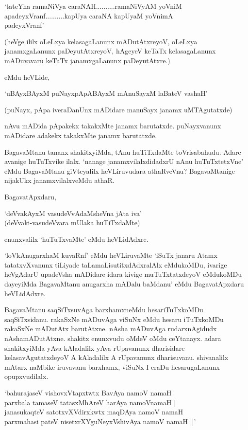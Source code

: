 \begin{shloka}
`tateYha ramaNiVya caraNAH..........ramaNiVyAM yoVniM\\
apadeyxVranf..........kapUya caraNA kapUyaM yoVnimA\\
padeyxVranf'
\end{shloka}

(heVge ililx oLeLxya kelasagaLanunx mADutAtxreyoV, oLeLxya janamxgaLanunx paDeyutAtxreyoV, hAgeyeV keTaTx kelasagaLanunx mADuvavaru keTaTx janamxgaLanunx paDeyutAtxre.)

eMdu heVLide,

\begin{shloka}
`uBAyxBAyxM puNayxpApABAyxM mAnuSayxM laBateV vashaH'
\end{shloka}

(puNayx, pApa iveraDanUnx mADidare manuSayx janamx uMTAgutatxde)

nAvu mADida pApakekx takakxMte janamx barutatxde. puNayxvanunx mADidare adakekx takakxMte janamx barutatxde.

BagavaMtanu tananx shakitxyiMda, tAnu huTiTxdaMte toVrisabahudu. Adare avanige huTuTxvike ilalx. `nanage janamxvilalxdidadxrU nAnu huTuTxtetxVne' eMdu BagavaMtanu giVteyalilx heVLiruvudara athaRveVnu? BagavaMtanige nijakUkx janamxvilalxveMdu athaR.

BagavatApxdaru,

\begin{shloka}
`deVvakAyxM vasudeVvAdaMsheVna jAta iva'\\
(deVvaki-vasudeVvara mUlaka huTiTxdaMte)
\end{shloka}

enunxvalilx `huTuTxvaMte' eMdu heVLidAdxre.

`loVkAnugarxhaM kuvaRnf' eMdu heVLiruvaMte `iSuTx janaru Atamx tatatxvXvanunx tiLiyade taLamaLisutitxdAdxralAlx eMdukoMDu, ivarige heVgAdarU upadeVsha mADidare idara kivige muTuTxtatxdeyoV eMdukoMDu dayeyiMda BagavaMtanu anugarxha mADalu baMdanu' eMdu BagavatApxdaru heVLidAdxre.


BagavaMtanu saqSiTxsuvAga barxhamxneMdu hesariTuTxkoMDu saqSiTxsidanu. rakaSxNe mADuvAga viSuNx eMdu hesaru iTuTxkoMDu rakaSxNe mADutAtx barutAtxne. nAsha mADuvAga rudarxnAgidudx nAshamADutAtxne. shakitx enunxvudu oMdeV oMdu ceYtanayx. adara shakitxyiMda yAva kAladalilx yAva rUpavanunx dharisidare kelasavAgutatxdeyoV A kAladalilx A rUpavanunx dharisuvanu. shivanalilx mAtarx naMbike iruvavanu barxhamx, viSuNx I eraDu hesarugaLanunx opupxvudilalx.


\begin{shloka}
`bahurajaseV vishovxVtapxtwtx BavAya namoV namaH\\
parxbala tamaseV tatasxMhAreV harAya namoVnamaH‌ |\\
janasukaqteV satotxvXVdirxkwtx maqDAya namoV namaH\\
parxmahasi pateV nisetxrXYguNeyxVshivAya namoV namaH ||'
\end{shloka}

